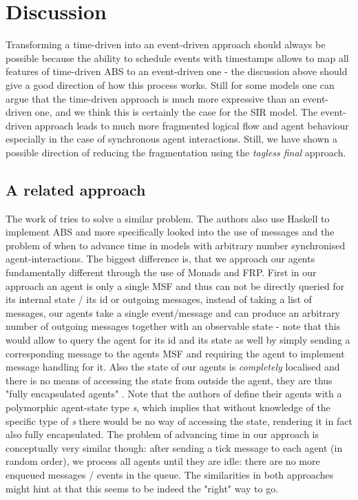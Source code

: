 \section{Discussion}
Transforming a time-driven into an event-driven approach should always be possible because the ability to schedule events with timestamps allows to map all features of time-driven ABS to an event-driven one - the discussion above should give a good direction of how this process works. Still for some models one can argue that the time-driven approach is much more expressive than an event-driven one, and we think this is certainly the case for the SIR model. The event-driven approach leads to much more fragmented logical flow and agent behaviour especially in the case of synchronous agent interactions. Still, we have shown a possible direction of reducing the fragmentation using the \textit{tagless final} approach.

\subsection{A related approach}
The work of \cite{botta_time_2010} tries to solve a similar problem. The authors also use Haskell to implement ABS and more specifically looked into the use of messages and the problem of when to advance time in models with arbitrary number synchronised agent-interactions.
The biggest difference is, that we approach our agents fundamentally different through the use of Monads and FRP. First in our approach an agent is only a single MSF and thus can not be directly queried for its internal state / its id or outgoing messages, instead of taking a list of messages, our agents take a single event/message and can produce an arbitrary number of outgoing messages together with an observable state - note that this would allow to query the agent for its id and its state as well by simply sending a corresponding message to the agents MSF and requiring the agent to implement message handling for it. Also the state of our agents is \textit{completely} localised and there is no means of accessing the state from outside the agent, they are thus "fully encapsulated agents" \cite{botta_time_2010}. Note that the authors of \cite{botta_time_2010} define their agents with a polymorphic agent-state type \textit{s}, which implies that without knowledge of the specific type of \textit{s} there would be no way of accessing the state, rendering it in fact also fully encapsulated.
The problem of advancing time in our approach is conceptually very similar though: after sending a tick message to each agent (in random order), we process all agents until they are idle: there are no more enqueued messages / events in the queue. The similarities in both approaches might hint at that this seems to be indeed the "right" way to go. %

